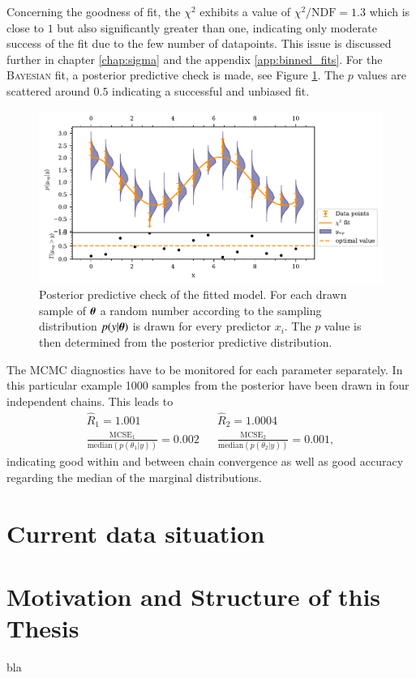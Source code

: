 Concerning the goodness of fit, the $\chi^2$ exhibits a value of $\chi^2/\text{NDF}=1.3$ which is close to $1$ but also significantly greater than one, indicating only moderate success of the fit due to the few number of datapoints. This issue is discussed further in chapter \ref{chap:sigma} and the appendix \ref{app:binned_fits}. For the \textsc{Bayesian} fit, a posterior predictive check is made, see Figure \ref{fig:ppc}. The $p$ values are scattered around $0.5$ indicating a successful and unbiased fit.
\begin{figure}[htbp]
	\centering
	\includegraphics[width=\linewidth]{../bayes/noisy_model/ppd_2_params.pdf}
	\caption{Posterior predictive check of the fitted model. For each drawn sample of $\boldsymbol{\theta}$ a random number according to the sampling distribution $p(y|\boldsymbol{\theta})$ is drawn for every predictor $x_i$. The $p$ value is then determined from the posterior predictive distribution.}
	\label{fig:ppc}
\end{figure}
The MCMC diagnostics have to be monitored for each parameter separately. In this particular example 1000 samples from the posterior have been drawn in four independent chains. This leads to
\begin{align}
	\widehat{R}_1 = 1.001 && \widehat{R}_2 = 1.0004\\
	\frac{\text{MCSE}_1}{\text{median}(p(\theta_1|y))}=0.002 &&\frac{\text{MCSE}_2}{\text{median}(p(\theta_2|y))}=0.001,
\end{align}
indicating good within and between chain convergence as well as good accuracy regarding the median of the marginal distributions.
\section{Current data situation}

\section{Motivation and Structure of this Thesis}
bla
